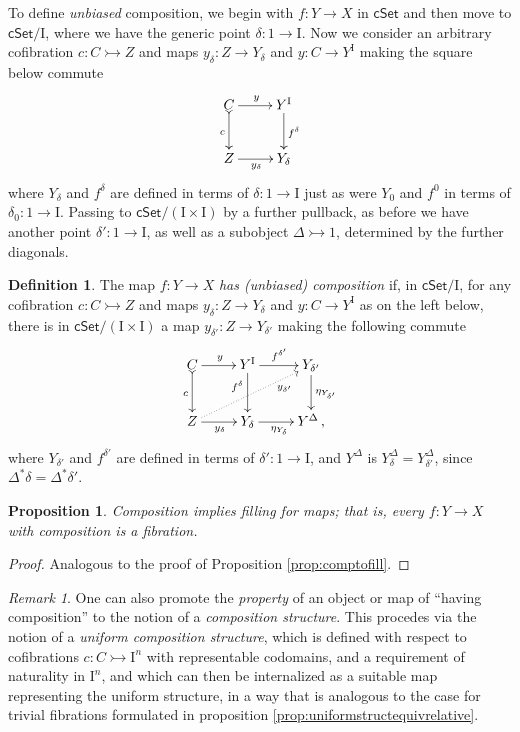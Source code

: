 \documentclass[11pt]{article}
\newcommand{\cSet}{\ensuremath{\mathsf{cSet}}}
\newcommand{\mono}{\ensuremath{\rightarrowtail}}
\newcommand{\ra}{\ensuremath{\rightarrow}}
\newcommand{\I}{\ensuremath{\mathrm{I}}}
\newtheorem{proposition}[theorem]{Proposition}
\theoremstyle{remark}
\newtheorem{remark}[theorem]{Remark}
\theoremstyle{definition}
\newtheorem{definition}[theorem]{Definition}
\begin{document}
To define \emph{unbiased} composition, we begin with $f : Y\ra X$ in $\cSet$ and then move to $\cSet/\I$, where we have the generic point $\delta : 1\ra\I$.  Now we consider an arbitrary cofibration $c : C\mono Z$ and maps $y_\delta : Z\ra Y_\delta$ and $y : C\ra Y^\I$ making the square below commute
\begin{equation}\label{diagram:composition3}
\xymatrix{
C \ar@{>->}[d]_{c} \ar[r]^{y} & Y^\I \ar[d]^{f^\delta} \\
Z \ar[r]_{y_\delta} & Y_\delta 
}
\end{equation}
where $Y_\delta$ and $f^\delta$ are defined in terms of $\delta : 1\ra \I$ just as were $Y_0$ and $f^0$ in terms of $\delta_0 : 1\ra \I$.  Passing to $\cSet/(\I\times \I)$ by a further pullback, as before we have another point $\delta':1\ra\I$, as well as a subobject $\Delta \mono 1$, determined by the further diagonals.

\begin{definition}
The map $f:Y\ra X$ \emph{has (unbiased) composition} if, in $\cSet/\I$, for any cofibration $c : C\mono Z$ and maps $y_\delta : Z\ra Y_\delta$ and $y : C\ra Y^\I$ as on the left below, there is in $\cSet/(\I\times \I)$ a map $y_{\delta'} : Z\ra Y_{\delta'}$ making the following commute
\begin{equation}\label{diagram:composition4}
\xymatrix{
C \ar@{>->}[d]_{c} \ar[r]^{y} & Y^\I \ar[d]_>>>>>>>{f^\delta} \ar[r]^{f^{\delta'}} & Y_{\delta'} \ar[d]^{\eta_{Y_{\delta'}}}\\
Z \ar@{..>}[rru]_>>>>>>{y_{\delta'}} \ar[r]_{y_\delta} & Y_\delta \ar[r]_{\eta_{Y_\delta}} & Y^\Delta\,,
}
\end{equation}
where $Y_{\delta'}$ and $f^{\delta'}$ are defined in terms of $\delta' : 1\ra \I$, and $Y^\Delta$ is $Y_\delta^\Delta = Y_{\delta'}^\Delta$, since $\Delta^*{\delta} = \Delta^*{\delta'}$.
\end{definition}


\begin{proposition}\label{prop:comptofillmap}
Composition implies filling for maps; that is, every $f : Y\ra X$ with composition is a fibration.
\end{proposition}

\begin{proof}
Analogous to the proof of Proposition \ref{prop:comptofill}.
\end{proof}

\begin{remark}
One can also promote the \emph{property} of an object or map of ``having composition'' to the notion of a \emph{composition structure}.  This procedes via the notion of a \emph{uniform composition structure}, which is defined with respect to cofibrations $c : C\mono \I^n$ with representable codomains, and a requirement of naturality in $\I^n$, and which can then be internalized as a suitable map representing the uniform structure, in a way that is analogous to the case for trivial fibrations formulated in proposition \ref{prop:uniformstructequivrelative}.
\end{remark}
\end{document}
